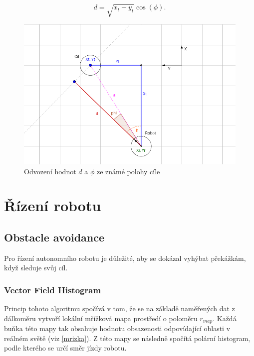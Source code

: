 \documentclass[twoside]{ctuthesis}
\theoremstyle{plain}
\theoremstyle{definition}
\theoremstyle{note}
\begin{document}
\begin{equation}
d = \sqrt{x_t + y_t}\cos(\phi).
\end{equation}
\begin{figure}
	\caption{Odvození hodnot $d$ a $\phi$ ze známé polohy cíle}
	
	\label{inv}
	\includegraphics[width=1\textwidth]{images/2/neco.png}
\end{figure}
\chapter{Řízení robotu}

\section{Obstacle avoidance}

Pro řízení autonomního robotu je důležité, aby se dokázal vyhýbat překážkám, když sleduje svůj cíl. 

\subsection{Vector Field Histogram}



Princip tohoto algoritmu spočívá v tom, že se na základě naměřených dat z dálkoměru vytvoří lokální mřížková mapa prostředí o poloměru $r_{map}$. Každá buňka této mapy tak obsahuje hodnotu obsazenosti odpovídající oblasti v reálném světě (viz \ref{mrizka}). Z této mapy se následně spočítá polární histogram, podle kterého se určí směr jízdy robotu.
\end{document}
